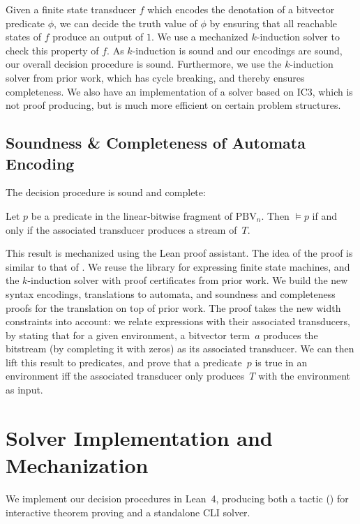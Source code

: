 Given a finite state transducer $f$ which encodes the denotation of a bitvector predicate $\phi$,
we can decide the truth value of $\phi$ by ensuring that all reachable states of $f$ produce an output of $1$.
We use a mechanized $k$-induction solver to check this property of $f$.
As $k$-induction is sound and our encodings are sound, our overall decision procedure is sound.
Furthermore, we use the $k$-induction solver from prior work, which has cycle breaking, and thereby ensures completeness.
We also have an implementation of a solver based on IC3,
which is not proof producing, but is much more efficient on certain problem structures.


\subsection{Soundness \& Completeness of Automata Encoding}

The decision procedure is sound and complete:
\begin{theorem}
  Let $p$ be a predicate in the linear-bitwise fragment of $\text{PBV}_n$.
  Then $\vDash p$ if and only if the associated transducer produces a stream
  of~$T$.
\end{theorem}
%
\noindent
This result is mechanized using the Lean proof assistant. The idea of the proof
is similar to that of \citet{bhat2025certified}. We reuse the library for expressing finite state machines,
and the $k$-induction solver with proof certificates from prior work.
We build the new syntax encodings, translations to automata, and soundness and completeness proofs for the translation on top of prior work.
The proof takes the new width constraints into account: we relate expressions with their associated
transducers, by stating that for a given environment, a bitvector term~$a$
produces the bitstream (by completing it with zeros) as its associated
transducer.
%
We can then lift this result to predicates, and prove that a predicate~$p$ is
true in an environment iff the associated transducer only produces~$T$ with the
environment as input.

\section{Solver Implementation and Mechanization}
\label{sec:mwbv:implementation}

We implement our decision procedures in Lean~4, producing
both a tactic (\ourtactic{}) for interactive theorem proving and a standalone CLI solver.

